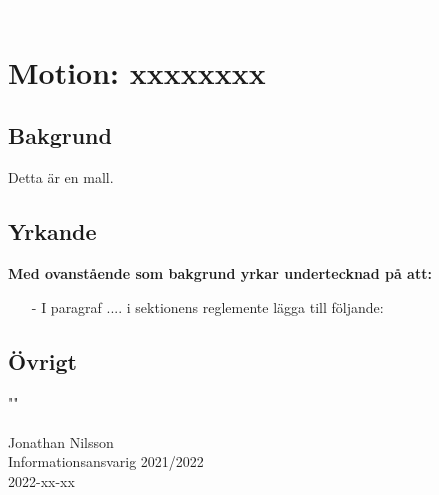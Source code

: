 \textcolor{white}{.} %



\section*{Motion: xxxxxxxx}
\subsection*{Bakgrund}
Detta är en mall. 
\subsection*{Yrkande}
\textbf{Med ovanstående som bakgrund yrkar undertecknad på att:}
\begin{itemize}
    \item[-] I paragraf .... i sektionens reglemente lägga till följande:
    
\end{itemize} 




\subsection*{Övrigt}
""\\


\noindent \makebox[2.5in]{\hrulefill} \\
\noindent Jonathan Nilsson\\
Informationsansvarig 2021/2022\\
2022-xx-xx
